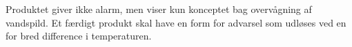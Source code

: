 Produktet giver ikke alarm, men viser kun konceptet bag overvågning af vandspild. Et færdigt produkt skal have en form for advarsel som udløses ved en for bred difference i temperaturen.
\\
\\


